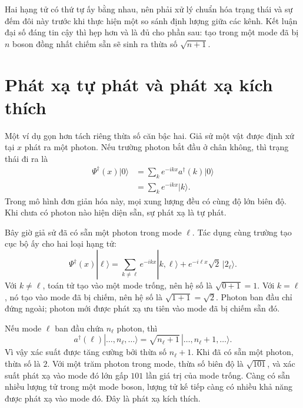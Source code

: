 Hai hạng tử có thứ tự ấy bằng nhau, nên phải xử lý chuẩn hóa trạng thái và sự đếm đôi này trước khi thực hiện một so sánh định lượng giữa các kênh. Kết luận đại số đáng tin cậy thì hẹp hơn và là đủ cho phần sau: tạo trong một mode đã bị \(n\) boson đồng nhất chiếm sẵn sẽ sinh ra thừa số \(\sqrt{n+1}\).

\section{Phát xạ tự phát và phát xạ kích thích}

Một ví dụ gọn hơn tách riêng thừa số căn bậc hai. Giả sử một vật được định xứ tại \(x\) phát ra một photon. Nếu trường photon bắt đầu ở chân không, thì trạng thái đi ra là
\begin{align}
\Psi^\dagger(x)|0\rangle
&=\sum_k e^{-ikx}a^\dagger(k)|0\rangle\\
&=\sum_k e^{-ikx}|k\rangle.
\end{align}
Trong mô hình đơn giản hóa này, mọi xung lượng đều có cùng độ lớn biên độ. Khi chưa có photon nào hiện diện sẵn, sự phát xạ là tự phát.

Bây giờ giả sử đã có sẵn một photon trong mode \(\ell\). Tác dụng cùng trường tạo cục bộ ấy cho hai loại hạng tử:
\begin{equation}
\Psi^\dagger(x)|\ell\rangle
=
\sum_{k\ne\ell}e^{-ikx}|k,\ell\rangle
+e^{-i\ell x}\sqrt{2}\,|2_\ell\rangle.
\end{equation}
Với \(k\ne\ell\), toán tử tạo vào một mode trống, nên hệ số là \(\sqrt{0+1}=1\). Với \(k=\ell\), nó tạo vào mode đã bị chiếm, nên hệ số là \(\sqrt{1+1}=\sqrt{2}\). Photon ban đầu chỉ đứng ngoài; photon mới được phát xạ ưu tiên vào mode đã bị chiếm sẵn đó.

\begin{classroomqa}
\end{classroomqa}

Nếu mode \(\ell\) ban đầu chứa \(n_\ell\) photon, thì
\begin{equation}
a^\dagger(\ell)
|\ldots,n_\ell,\ldots\rangle
=
\sqrt{n_\ell+1}
\,|\ldots,n_\ell+1,\ldots\rangle.
\end{equation}
Vì vậy xác suất được tăng cường bởi thừa số \(n_\ell+1\). Khi đã có sẵn một photon, thừa số là \(2\). Với một trăm photon trong mode, thừa số biên độ là \(\sqrt{101}\), và xác suất phát xạ vào mode đó lớn gấp \(101\) lần giá trị của mode trống. Càng có sẵn nhiều lượng tử trong một mode boson, lượng tử kế tiếp càng có nhiều khả năng được phát xạ vào mode đó. Đây là phát xạ kích thích.


